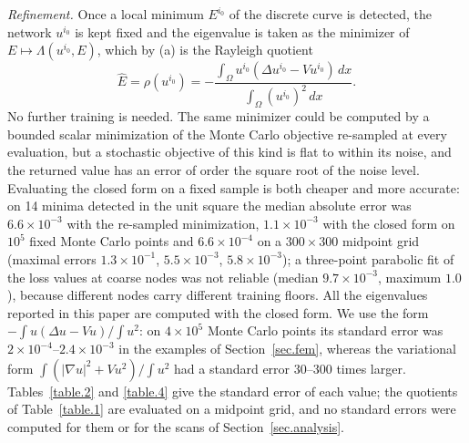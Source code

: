\documentclass[10pt]{amsart}
\newenvironment{revblock}{\color{blue}}{}
\theoremstyle{definition}
\theoremstyle{remark}
\theoremstyle{plain}
\begin{document}
\begin{revblock}
\noindent\emph{Refinement.} Once a local minimum $E^{i_0}$ of the discrete curve is detected, the
network $u^{i_0}$ is kept fixed and the eigenvalue is taken as the minimizer of
$E\mapsto\Lambda(u^{i_0},E)$, which by (a) is the Rayleigh quotient
\[
\hat E=\rho(u^{i_0})=-\frac{\int_\Omega u^{i_0}(\Delta u^{i_0}-Vu^{i_0})\,dx}{\int_\Omega (u^{i_0})^2\,dx}.
\]
No further training is needed. The same minimizer could be computed by a bounded scalar
minimization of the Monte Carlo objective re-sampled at every evaluation, but a stochastic objective
of this kind is flat to within its noise, and the returned value has an error of order the square
root of the noise level. Evaluating the closed form on a fixed sample is both cheaper and more
accurate: on 14 minima detected in the unit square the median absolute error was
$6.6\times10^{-3}$ with the re-sampled minimization, $1.1\times10^{-3}$ with the closed form on
$10^5$ fixed Monte Carlo points and $6.6\times10^{-4}$ on a $300\times300$ midpoint grid (maximal
errors $1.3\times10^{-1}$, $5.5\times10^{-3}$, $5.8\times10^{-3}$); a three-point parabolic fit of the
loss values at coarse nodes was not reliable (median $9.7\times10^{-3}$, maximum $1.0$), because
different nodes carry different training floors. All the eigenvalues reported in this paper are
computed with the closed form. We use the form $-\int u(\Delta u-Vu)/\int u^2$: on $4\times10^5$
Monte Carlo points its standard error was $2\times10^{-4}$--$2.4\times10^{-3}$ in the examples of
Section~\ref{sec.fem}, whereas the variational form $\int(|\nabla u|^2+Vu^2)/\int u^2$ had a standard
error $30$--$300$ times larger. Tables~\ref{table.2} and \ref{table.4} give the standard error of each
value; the quotients of Table~\ref{table.1} are evaluated on a midpoint grid, and no standard errors
were computed for them or for the scans of Section~\ref{sec.analysis}.


\end{revblock}
\end{document}
